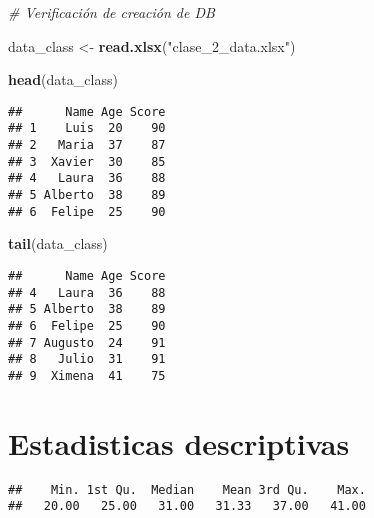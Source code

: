 \documentclass[
]{book}
\newenvironment{Shaded}{\begin{snugshade}}{\end{snugshade}}
\newcommand{\CommentTok}[1]{\textcolor[rgb]{0.56,0.35,0.01}{\textit{#1}}}
\newcommand{\FunctionTok}[1]{\textcolor[rgb]{0.13,0.29,0.53}{\textbf{#1}}}
\newcommand{\NormalTok}[1]{#1}
\newcommand{\OtherTok}[1]{\textcolor[rgb]{0.56,0.35,0.01}{#1}}
\newcommand{\SpecialCharTok}[1]{\textcolor[rgb]{0.81,0.36,0.00}{\textbf{#1}}}
\newcommand{\StringTok}[1]{\textcolor[rgb]{0.31,0.60,0.02}{#1}}
\theoremstyle{definition}
\theoremstyle{definition}
\theoremstyle{definition}
\theoremstyle{definition}
\theoremstyle{remark}
\begin{document}
\begin{Shaded}
\begin{Highlighting}[]
\CommentTok{\# Verificación de creación de DB}

\NormalTok{data\_class }\OtherTok{\textless{}{-}} \FunctionTok{read.xlsx}\NormalTok{(}\StringTok{"clase\_2\_data.xlsx"}\NormalTok{)}

\FunctionTok{head}\NormalTok{(data\_class)}
\end{Highlighting}
\end{Shaded}

\begin{verbatim}
##      Name Age Score
## 1    Luis  20    90
## 2   Maria  37    87
## 3  Xavier  30    85
## 4   Laura  36    88
## 5 Alberto  38    89
## 6  Felipe  25    90
\end{verbatim}

\begin{Shaded}
\begin{Highlighting}[]
\FunctionTok{tail}\NormalTok{(data\_class)}
\end{Highlighting}
\end{Shaded}

\begin{verbatim}
##      Name Age Score
## 4   Laura  36    88
## 5 Alberto  38    89
## 6  Felipe  25    90
## 7 Augusto  24    91
## 8   Julio  31    91
## 9  Ximena  41    75
\end{verbatim}

\hypertarget{estadisticas-descriptivas}{%
\section*{Estadisticas descriptivas}\label{estadisticas-descriptivas}}

\begin{Shaded}
\end{Shaded}

\begin{verbatim}
##    Min. 1st Qu.  Median    Mean 3rd Qu.    Max. 
##   20.00   25.00   31.00   31.33   37.00   41.00
\end{verbatim}
\end{document}
